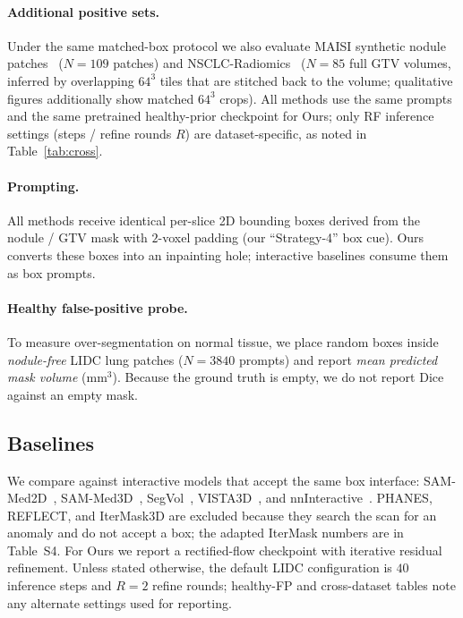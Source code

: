 \documentclass[twoside]{article}
\newcommand{\suppTabUnprompted}{Table~S4}
\begin{document}
\paragraph{Additional positive sets.}
Under the same matched-box protocol we also evaluate
MAISI synthetic nodule patches~\citep{maisi2025} (\(N{=}109\) patches) and
NSCLC-Radiomics~\citep{aerts2014nsclc} (\(N{=}85\) full GTV volumes,
inferred by overlapping \(64^{3}\) tiles that are stitched back to the volume;
qualitative figures additionally show matched \(64^{3}\) crops).
All methods use the same prompts and the same pretrained healthy-prior
checkpoint for Ours; only RF inference settings (steps / refine rounds \(R\))
are dataset-specific, as noted in Table~\ref{tab:cross}.

\paragraph{Prompting.}
All methods receive identical per-slice 2D bounding boxes derived from the
nodule / GTV mask with \(2\)-voxel padding (our ``Strategy-4'' box cue).
Ours converts these boxes into an inpainting hole; interactive baselines
consume them as box prompts.

\paragraph{Healthy false-positive probe.}
To measure over-segmentation on normal tissue, we place random boxes inside
\emph{nodule-free} LIDC lung patches (\(N{=}3840\) prompts) and report
\emph{mean predicted mask volume} (mm\(^3\)). Because the ground truth is
empty, we do not report Dice against an empty mask.

\subsection{Baselines}
We compare against interactive models that accept the same box interface:
SAM-Med2D~\citep{sam_med2d2023},
SAM-Med3D~\citep{sam_med3d2023},
SegVol~\citep{segvol2024},
VISTA3D~\citep{vista3d2024}, and
nnInteractive~\citep{nninteractive2025}.
PHANES, REFLECT, and IterMask3D are excluded because they search the
scan for an anomaly and do not accept a box; the adapted IterMask
numbers are in \suppTabUnprompted{}.
For Ours we report a rectified-flow checkpoint with iterative residual
refinement. Unless stated otherwise, the default LIDC configuration is
\(40\) inference steps and \(R{=}2\) refine rounds; healthy-FP and
cross-dataset tables note any alternate settings used for reporting.
\end{document}
